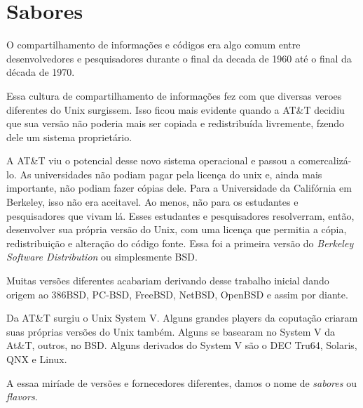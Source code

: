 
\chapter{Sabores}

O compartilhamento de informações e códigos era algo comum entre desenvolvedores e
pesquisadores durante o final da decada de 1960 até o final da década de 1970.

Essa cultura de compartilhamento de informações fez com que diversas veroes
diferentes do Unix surgissem. Isso ficou mais evidente quando a AT\&T decidiu
que sua versão não poderia mais ser copiada e redistribuída livremente, fzendo
dele um sistema proprietário.

A AT\&T viu o potencial desse novo sistema operacional e passou a
comercalizá-lo. As universidades não podiam pagar pela licença do unix e,
ainda mais importante, não podiam fazer cópias dele.  Para a Universidade da
Califórnia em Berkeley, isso não era aceitavel. Ao menos, não para os
estudantes e pesquisadores que vivam lá. Esses estudantes e pesquisadores
resolverram, então, desenvolver sua própria versão do Unix, com uma licença
que permitia a cópia, redistribuição e alteração do código fonte. Essa foi a
primeira versão do \emph{Berkeley Software Distribution} ou simplesmente BSD.

Muitas versões diferentes acabariam derivando desse trabalho inicial dando
origem ao 386BSD, PC-BSD, FreeBSD, NetBSD, OpenBSD e assim por diante.

Da AT\&T surgiu o Unix System V. Alguns grandes players da coputação criaram
suas próprias versões do Unix também. Alguns se basearam no System V da At\&T,
outros, no BSD. Alguns derivados do System V são o DEC Tru64, Solaris, QNX e Linux.

A essaa miríade de versões e fornecedores diferentes, damos o nome de
\emph{sabores} ou \emph{flavors}.
